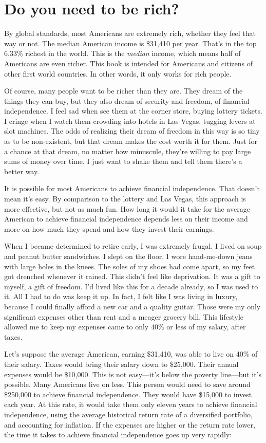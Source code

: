 \chapter{Do you need to be rich?}
By global standards, most Americans are extremely rich, whether they feel that way or not. The median American income is \$31,410 per year.\cite{2007-median-income} That's in the top 6.33\% richest in the world.\cite{globalrichlist} This is the \emph{median} income, which means half of Americans are even richer. This book is intended for Americans and citizens of other first world countries. In other words, it only works for rich people.

Of course, many people want to be richer than they are. They dream of the things they can buy, but they also dream of security and freedom, of financial independence. I feel sad when see them at the corner store, buying lottery tickets. I cringe when I watch them crowding into hotels in Las Vegas, tugging levers at slot machines. The odds of realizing their dream of freedom in this way is so tiny as to be non-existent, but that dream makes the cost worth it for them. Just for a chance at that dream, no matter how minuscule, they're willing to pay large sums of money over time. I just want to shake them and tell them there's a better way.

It is possible for most Americans to achieve financial independence. That doesn't mean it's easy. By comparison to the lottery and Las Vegas, this approach is more effective, but not as much fun. How long it would it take for the average American to achieve financial independence depends less on their income and more on how much they spend and how they invest their earnings.

When I became determined to retire early, I was extremely frugal. I lived on soup and peanut butter sandwiches. I slept on the floor. I wore hand-me-down jeans with large holes in the knees. The soles of my shoes had come apart, so my feet got drenched whenever it rained. This didn't feel like deprivation. It was a gift to myself, a gift of freedom. I'd lived like this for a decade already, so I was used to it. All I had to do was keep it up. In fact, I felt like I was living in luxury, because I could finally afford a new car and a quality guitar. Those were my only significant expenses other than rent and a meager grocery bill. This lifestyle allowed me to keep my expenses came to only 40\% or less of my salary, after taxes.

Let's suppose the average American, earning \$31,410, was able to live on 40\% of their salary. Taxes would bring their salary down to \$25,000. Their annual expenses would be \$10,000. This is not easy---it's below the poverty line---but it's possible. Many Americans live on less. This person would need to save around \$250,000 to achieve financial independence. They would have \$15,000 to invest each year. At this rate, it would take them only eleven years to achieve financial independence, using the average historical return rate of a diversified portfolio, and accounting for inflation. If the expenses are higher or the return rate lower, the time it takes to achieve financial independence goes up very rapidly:


